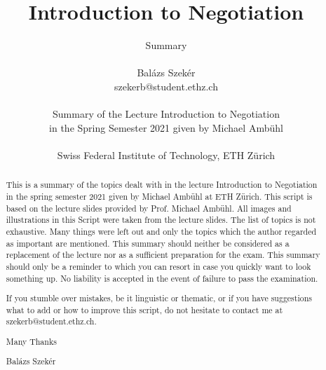 \documentclass[a4paper]{article}
\title{Introduction to Negotiation}
\author{Summary \\ \\ Balázs Szekér \\ szekerb@student.ethz.ch \\ \\
    Summary of the Lecture Introduction to Negotiation \\
    in the Spring Semester 2021 given by Michael Ambühl \\ \\
    Swiss Federal Institute of Technology, ETH Zürich}
\theoremstyle{definition}
\begin{document}
    

\begin{titlepage}
    \maketitle
    \thispagestyle{empty}
\end{titlepage}

\newpage
{}
\thispagestyle{myplain}
\begin{abstract}
    This is a summary of the topics dealt with in the lecture Introduction to
    Negotiation in the spring semester 2021 given by Michael Ambühl at ETH Zürich.
    This script is based on the lecture slides provided by Prof. Michael Ambühl.
    All images and illustrations in this Script were taken from the lecture
    slides. The list of topics is not exhaustive. Many things were left out and
    only the topics which the author regarded as important are mentioned.
    This summary should neither be considered as a replacement of the lecture nor as
    a sufficient preparation for the exam. This summary should only be a reminder to
    which you can resort in case you quickly want to look something up.
    No liability is accepted in the event of failure to pass the examination.

    \vspace{1\baselineskip}

    If you stumble over mistakes, be it linguistic or thematic, or if you have suggestions
    what to add or how to improve this script, do not hesitate to contact me at
    szekerb@student.ethz.ch.

    \vspace{1\baselineskip}

    Many Thanks
    
    \vspace{1\baselineskip}

    Balázs Szekér
\end{abstract}

\newpage
\thispagestyle{myplain}
\tableofcontents

\newpage




\pagebreak



\pagebreak


\end{document}
